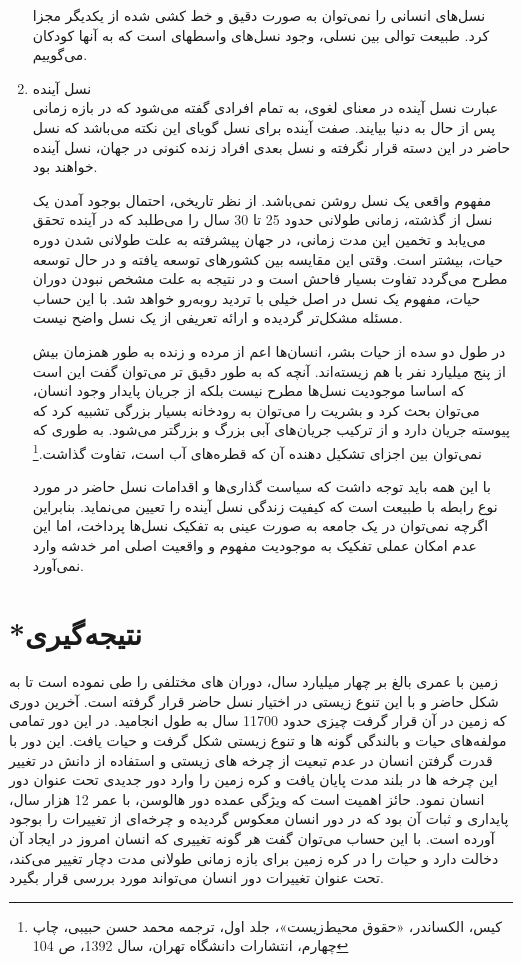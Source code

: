 \begin{enumerate}
				نسل‌های انسانی را نمی‌توان به صورت دقیق و خط کشی شده از یکدیگر مجزا کرد. طبیعت توالی بین نسلی، وجود نسل‌های واسطهای است که به آنها کودکان می‌گوییم.
				\item نسل آینده\\
				عبارت نسل آینده در معنای لغوی،  به تمام افرادی گفته می‌شود که در بازه زمانی پس از حال به دنیا بیایند. صفت آینده برای نسل گویای این نکته می‌باشد که نسل حاضر در این دسته قرار نگرفته و نسل بعدی افراد زنده کنونی در جهان، نسل آینده خواهند بود. 
				
				مفهوم واقعی یک نسل روشن نمی‌باشد. از نظر تاریخی، احتمال بوجود آمدن یک نسل از گذشته، زمانی طولانی حدود 25 تا 30 سال را می‌طلبد که در آینده تحقق می‌یابد و تخمین این مدت زمانی، در جهان پیشرفته به علت طولانی شدن دوره حیات، بیشتر است. وقتی این مقایسه بین کشور‌های توسعه یافته و در حال توسعه مطرح می‌گردد تفاوت بسیار فاحش است و در نتیجه به علت مشخص نبودن دوران حیات، مفهوم یک نسل در اصل خیلی با تردید روبه‌رو خواهد شد. با این حساب مسئله مشکل‌تر گردیده و ارائه تعریفی از یک نسل واضح نیست. 
				
				در طول دو سده از حیات بشر، انسان‌ها اعم از مرده و زنده به طور همزمان بیش از پنج میلیارد نفر با هم زیسته‌اند. آنچه که به طور دقیق تر می‌توان گفت این است که اساسا موجودیت نسل‌ها مطرح نیست بلکه از جریان پایدار وجود انسان، می‌توان بحث کرد و بشریت را می‌توان به رودخانه بسیار بزرگی تشبیه کرد که پیوسته جریان دارد و از ترکیب جریان‌های آبی بزرگ و بزرگتر می‌شود. به طوری که نمی‌توان بین اجزای تشکیل دهنده آن که قطره‌های آب است، تفاوت گذاشت.\footnote{کیس، الکساندر، «حقوق  محیط‌زیست»، جلد اول، ترجمه محمد حسن حبیبی، چاپ چهارم، انتشارات دانشگاه تهران، سال 1392، ص 104}  
				
				با این همه باید توجه داشت که سیاست گذاری‌ها و اقدامات نسل حاضر در مورد نوع رابطه با طبیعت است که کیفیت زندگی نسل آینده را تعیین می‌نماید. بنابراین اگرچه نمی‌توان در یک جامعه به صورت عینی به تفکیک نسل‌ها پرداخت، اما این عدم امکان عملی تفکیک به موجودیت مفهوم و واقعیت اصلی امر خدشه وارد نمی‌آورد.
				
				
			\end{enumerate}
	
	
\section*{*نتیجه‌گیری}




زمین با عمری بالغ بر چهار میلیارد سال، دوران های مختلفی را طی نموده است تا به شکل حاضر و با این تنوع زیستی در اختیار نسل حاضر قرار گرفته است.  آخرین دوری که زمین در آن قرار گرفت چیزی حدود 11700 سال به طول انجامید. در این دور تمامی مولفه‌های حیات و بالندگی گونه ها و تنوع زیستی شکل گرفت و حیات یافت. این دور با قدرت گرفتن انسان در عدم تبعیت از چرخه های زیستی و استفاده از دانش در تغییر این چرخه ها در بلند مدت پایان یافت و کره زمین را وارد دور جدیدی تحت عنوان دور انسان نمود. حائز اهمیت است که ویژگی عمده دور هالوسن، با عمر 12 هزار سال، پایداری و ثبات آن بود که در دور انسان معکوس گردیده و چرخه‌ای از تغییرات را بوجود آورده است.  با این حساب می‌توان گفت هر گونه تغییری که انسان امروز در ایجاد آن دخالت دارد و حیات را در کره زمین برای بازه زمانی طولانی مدت دچار تغییر می‌کند، تحت عنوان تغییرات دور انسان می‌تواند مورد بررسی قرار بگیرد.



